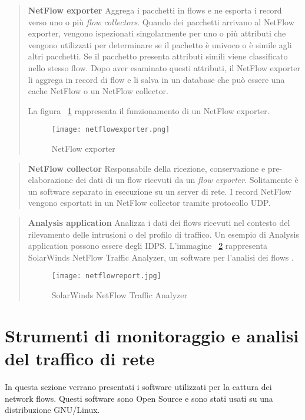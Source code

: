 \documentclass[../main.tex]{subfiles}
\begin{document}
\begin{verse}
\textbf{NetFlow exporter}
Aggrega i pacchetti in flows e ne esporta i record verso uno o più \textit{flow collectors}.
Quando dei pacchetti arrivano al NetFlow exporter, vengono ispezionati singolarmente per uno o più attributi che vengono utilizzati per determinare se il pachetto è univoco o è simile agli altri pacchetti. Se il pacchetto presenta attributi simili viene classificato nello stesso flow.
Dopo aver esaminato questi attributi, il NetFlow exporter li aggrega in record di flow e li salva in un database che può essere una cache NetFlow o un NetFlow collector. 

La figura ~\ref{fig:netflowExporter} rappresenta il funzionamento di un NetFlow exporter.

\begin{figure}[H]
\centering
\texttt{[image: netflowexporter.png]}
\caption{NetFlow exporter}
\label{fig:netflowExporter}
\end{figure}

\end{verse}

\begin{verse}
\textbf{NetFlow collector}
Responsabile della ricezione, conservazione e pre-elaborazione dei dati di un flow ricevuti da un \textit{flow exporter}. Solitamente è un software separato in esecuzione su un server di rete. I record NetFlow vengono esportati in un NetFlow collector tramite protocollo UDP.
\end{verse}

\begin{verse}
\textbf{Analysis application} 
Analizza i dati dei flows ricevuti nel contesto del rilevamento delle intrusioni o del profilo di traffico. Un esempio di Analysis application possono essere degli IDPS.
L'immagine ~\ref{fig:solarwinds} rappresenta SolarWinds NetFlow Traffic Analyzer, un software per l'analisi dei flows \cite{solarwinds}.

\begin{figure}[H]
\centering
\texttt{[image: netflowreport.jpg]}
\caption{SolarWinds NetFlow Traffic Analyzer}
\label{fig:solarwinds}
\end{figure}
\end{verse}

\section{Strumenti di monitoraggio e analisi del traffico di rete}
In questa sezione verrano presentati i software utilizzati per la cattura dei network flows. Questi software sono Open Source e sono stati usati su una distribuzione GNU/Linux.
\end{document}

